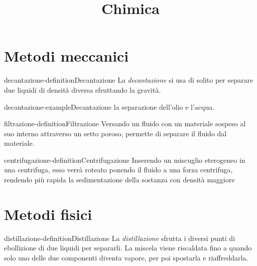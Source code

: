 \documentclass[preview]{standalone}
\begin{document}
\title{Chimica}
\genpage

\section{Metodi meccanici}


\begin{snippetdefinition}{decantazione-definition}{Decantazione}
    La \textit{decantazione} si usa di solito per separare due liquidi di densità diversa
    sfruttando la gravità.
\end{snippetdefinition}

\begin{snippetexample}{decantazione-example}{Decantazione}
    la separazione dell'olio e l'acqua.
\end{snippetexample}

\begin{snippetdefinition}{filtrazione-definition}{Filtrazione}
    Versando un fluido con un materiale sospeso al suo interno attraverso un setto poroso,
    permette di separare il fluido dal materiale.
\end{snippetdefinition}

\begin{snippetdefinition}{centrifugazione-definition}{Centrifugazione}
    Inserendo un miscuglio eterogeneo in una centrifuga, esso verrà roteato ponendo il
    fluido a una forza centrifuga, rendendo più rapida la sedimentazione della sostanza con densità maggiore
\end{snippetdefinition}

\section{Metodi fisici}


\begin{snippetdefinition}{distillazione-definition}{Distillazione}
    La \textit{distillazione} sfrutta i diversi punti di ebollizione di due liquidi per separarli.
    La miscela viene riscaldata fino a quando solo uno delle due componenti diventa vapore, per poi
    spostarla e riaffreddarla.
\end{snippetdefinition}
\end{document}
